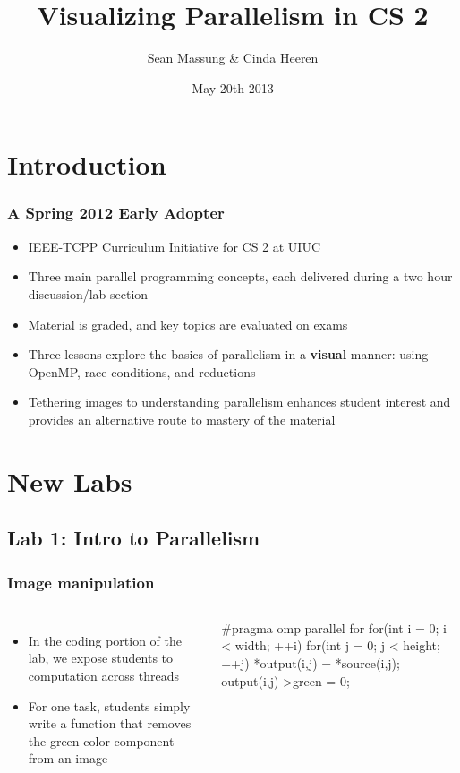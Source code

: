 \documentclass[table]{beamer}
\title[Visualizing Parallelism in CS 2]{Visualizing Parallelism in CS 2}
\author{Sean Massung \& Cinda Heeren}
\date{May 20th 2013}
\institute{University of Illinois at Urbana-Champaign}
\begin{document}
\frame{\titlepage}

\section{Introduction}

\begin{frame}
    \frametitle{A Spring 2012 Early Adopter}
    \begin{itemize}
         \item IEEE-TCPP Curriculum Initiative for CS 2 at UIUC
         \item Three main parallel programming concepts,
             each delivered during a two hour discussion/lab section
         \item Material is graded, and key topics are evaluated on exams
         \item Three lessons explore the basics of parallelism in a
             \textbf{visual} manner: using OpenMP, race conditions,
             and reductions
         \item Tethering images to understanding parallelism enhances
             student interest and provides an alternative route to
             mastery of the material
    \end{itemize}
\end{frame}

\section{New Labs}

\subsection{Lab 1: Intro to Parallelism}

\begin{frame}[fragile]
    \frametitle{Image manipulation}
    \begin{columns}
    \begin{itemize}
        \item In the coding portion of the lab, we expose students
            to computation across threads
        \item For one task, students simply write a function that
            removes the green color component from an image
    \end{itemize}
    \begin{cppcode}
#pragma omp parallel for
for(int i = 0; i < width; ++i)
{
   for(int j = 0; j < height; ++j)
   {
      *output(i,j) = *source(i,j);
       output(i,j)->green = 0;
   }
}
    \end{cppcode}
    \end{columns}
\end{frame}
\end{document}
